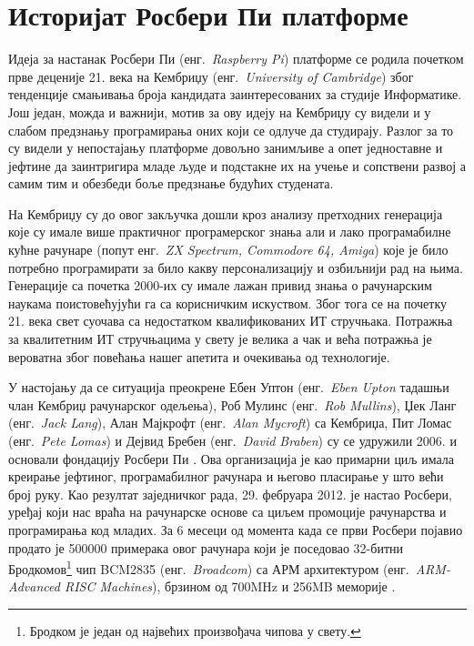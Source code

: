 \documentclass[12pt,oneside]{memoir}
\theoremstyle{remark}
\begin{document}
\section{Историјат Росбери Пи платформе }
Идеја за настанак Росбери Пи (енг.~{\em Raspberry Pi}) платформе се родила почетком прве деценије 21. века на Кембриџу (енг.~{\em University of Cambridge}) због тенденције смањивања броја кандидата заинтересованих за студије Информатике. Још један, можда и важнији, мотив за ову идеју на Кембриџу су видели и у слабом предзнању програмирања оних који се одлуче да студирају. Разлог за то су видели у непостајању платформе довољно занимљиве а опет једноставне и јефтине да заинтригира младе људе и подстакне их на учење и сопствени развој а самим тим и обезбеди боље предзнање будућих студената.

На Кембриџу су до овог закључка дошли кроз анализу претходних генерација које су имале више практичног програмерског знања али и лако програмабилне кућне рачунаре (попут енг.~{\em ZX Spectrum, Commodore 64, Amiga}) које је било потребно програмирати за било какву персонализацију и озбиљнији рад на њима. Генерације са почетка 2000-их су имале лажан привид знања о рачунарским наукама поистовећујући га са корисничким искуством. Због тога се на почетку 21. века свет суочава са недостатком квалификованих ИТ стручњака. Потражња за квалитетним ИТ стручњацима у свету је велика а чак и већа потражња је  вероватна због повећања нашег апетита и очекивања од технологије.

У настојању да се ситуација преокрене Ебен Уптон (енг.~{\em Eben Upton} тадашњи члан Кембриџ рачунарског одељења), Роб Мулинс (енг.~{\em Rob Mullins}), Џек Ланг (енг.~{\em Jack Lang}), Алан Мајкрофт (енг.~{\em Alan Mycroft}) са Кембриџа, Пит Ломас (енг.~{\em Pete Lomas}) и Дејвид Бребен (енг.~{\em David Braben}) су се удружили 2006. и основали фондацију Росбери Пи \cite{rpibook}. Ова организација је као примарни циљ имала креирање јефтиног, програмабилног рачунара и његово пласирање у што већи број руку. Као резултат заједничког рада, 29. фебруара 2012. је настао Росбери, уређај који нас враћа на рачунарске основе са циљем промоције рачунарства и програмирања код младих. За 6 месеци од момента када се први Росбери појавио продато је 500000 примерака овог рачунара који је поседовао 32-битни Бродкомов\footnote{Бродком је један од највећих произвођача чипова у свету.} чип BCM2835 (енг.~{\em Broadcom}) са АРМ архитектуром (енг.~{\em ARM-Advanced RISC Machines}), брзином од 700MHz и 256MB меморије \cite{rpibook}.
\end{document}
